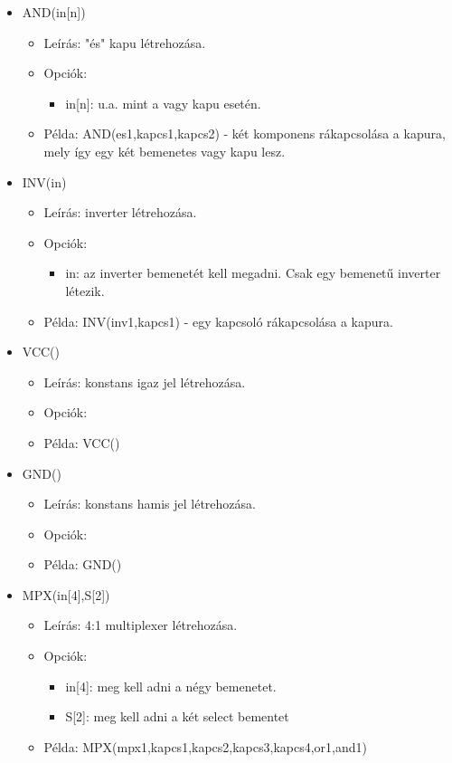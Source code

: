 \begin{itemize}
\item AND(in[n])
	\begin{itemize}
	\item Leírás: "és" kapu létrehozása.
	\item Opciók: 
		\begin{itemize}
			\item in[n]: u.a. mint a vagy kapu esetén.
		\end{itemize}
	\item Példa: AND(es1,kapcs1,kapcs2) - két komponens rákapcsolása a kapura, mely így egy két bemenetes vagy kapu lesz.
	\end{itemize}
	
\item INV(in)
	\begin{itemize}
	\item Leírás: inverter létrehozása.
	\item Opciók: 
		\begin{itemize}
			\item in: az inverter bemenetét kell megadni. Csak egy bemenetű inverter létezik.
		\end{itemize}
	\item Példa: INV(inv1,kapcs1) - egy kapcsoló rákapcsolása a kapura.
	\end{itemize}
	
\item VCC()
	\begin{itemize}
	\item Leírás: konstans igaz jel létrehozása.
	\item Opciók: 
		\begin{itemize}
		\end{itemize}
	\item Példa: VCC()
	\end{itemize}
	
\item GND()
	\begin{itemize}
	\item Leírás: konstans hamis jel létrehozása.
	\item Opciók: 
		\begin{itemize}
		\end{itemize}
	\item Példa: GND()
	\end{itemize}	

\item MPX(in[4],S[2])
	\begin{itemize}
	\item Leírás: 4:1 multiplexer létrehozása.
	\item Opciók: 
		\begin{itemize}
			\item in[4]: meg kell adni a négy bemenetet.
			\item S[2]: meg kell adni a két select bementet
		\end{itemize}
	\item Példa: MPX(mpx1,kapcs1,kapcs2,kapcs3,kapcs4,or1,and1)
	\end{itemize}	
	

\end{itemize}
